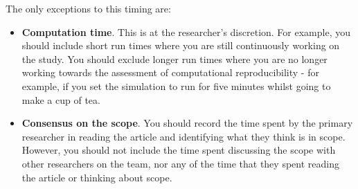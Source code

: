 The only exceptions to this timing are:
\begin{itemize}
    \item \textbf{Computation time}. This is at the researcher's discretion. For example, you should include short run times where you are still continuously working on the study. You should exclude longer run times where you are no longer working towards the assessment of computational reproducibility - for example, if you set the simulation to run for five minutes whilst going to make a cup of tea.
    \item \textbf{Consensus on the scope}. You should record the time spent by the primary researcher in reading the article and identifying what they think is in scope. However, you should not include the time spent discussing the scope with other researchers on the team, nor any of the time that they spent reading the article or thinking about scope.
\end{itemize}